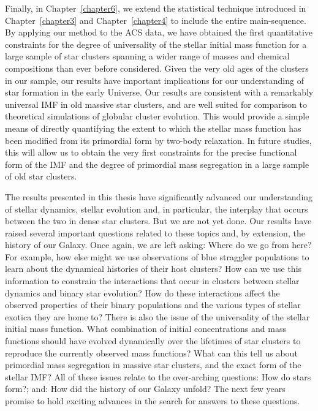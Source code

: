 Finally, in Chapter~\ref{chapter6}, we extend the statistical
technique introduced in 
Chapter~\ref{chapter3} and Chapter~\ref{chapter4} to include the
entire main-sequence.  By applying our method to the ACS data, we have
obtained the first quantitative constraints for the degree of
universality of the stellar initial mass function for a large sample
of star clusters spanning a wider range of masses and chemical
compositions than ever before considered.  Given the very old ages of
the clusters in our sample, our results have important
implications for our understanding of star formation in the early
Universe.  Our results are 
consistent with a remarkably universal IMF in old
massive star clusters, and are well suited for
comparison to theoretical simulations of globular cluster evolution.
This would provide a simple means of directly quantifying
the extent to which the stellar mass function has been modified from
its primordial form by two-body relaxation.  In future studies, this
will allow us to obtain the very first constraints for the precise
functional form of the IMF and the degree of
primordial mass segregation in a large sample of old star clusters.

The results presented in this thesis have significantly advanced our
understanding of stellar dynamics, 
stellar evolution and, in particular, the interplay that occurs
between the two in dense star clusters.
But we
are not yet done.  Our results have raised several important questions
related to these topics and, by extension, the history of our Galaxy.
Once again, we are left asking:  Where do we go from here?   For
example, how else might we use observations of blue straggler
populations to learn about the dynamical histories of their host
clusters?  How can we use this information to constrain the
interactions that occur in clusters between stellar dynamics and
binary star evolution?  How do these interactions affect the
observed properties of their binary populations and the various types
of stellar exotica they are home to?  There is also the issue of the
universality of the stellar 
initial mass function.  What combination of initial concentrations and
mass functions should have evolved dynamically over the lifetimes of
star clusters to reproduce the currently observed mass functions?
What can this tell us about primordial mass segregation in massive
star clusters, and the exact form of the stellar IMF?  All of these
issues relate to the over-arching questions:  How do stars
form?; and:  How did the history of our Galaxy unfold?  %
The next few years promise to hold exciting advances in the search for
answers to these questions.




